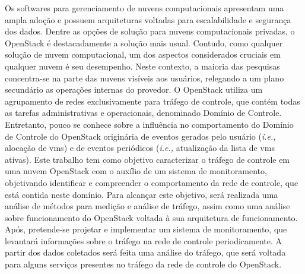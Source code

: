 Os softwares para gerenciamento de nuvens computacionais apresentam uma ampla adoção e possuem arquiteturas voltadas para escalabilidade e segurança dos dados. 
%
Dentre as opções de solução para nuvens computacionais privadas, o OpenStack é destacadamente a solução mais usual.
%
Contudo, como qualquer solução de nuvem computacional, um dos aspectos considerados cruciais em qualquer nuvem é seu desempenho.
%
Neste contexto, a maioria das pesquisas concentra-se na parte das nuvens visíveis aos usuários, relegando a um plano secundário as operações internas do provedor.
%
O OpenStack utiliza um agrupamento de redes exclusivamente para tráfego de controle, que contém todas as tarefas administrativas e operacionais, denominado Domínio de Controle. 
%
Entretanto, pouco se conhece sobre a influência no comportamento do Domínio de Controle do OpenStack originária de eventos gerados pelo usuário (\textit{i.e.,} alocação de \acp{vm}) e de eventos periódicos (\textit{i.e.,} atualização da lista de \acp{vm} ativas). 
%
Este trabalho tem como objetivo caracterizar o tráfego de controle em uma nuvem OpenStack com o auxílio de um sistema de monitoramento, objetivando identificar e compreender o comportamento da rede de controle, que está contida neste domínio.
%
Para alcançar este objetivo, será realizada uma análise de métodos para medição e análise de tráfego, assim como uma análise sobre funcionamento do OpenStack voltada à sua arquitetura de funcionamento. 
%
Após, pretende-se projetar e implementar um sistema de monitoramento, que levantará informações sobre o tráfego na rede de controle periodicamente. 
%
A partir dos dados coletados será feita uma análise do tráfego, que será voltada para alguns serviços presentes no tráfego da rede de controle do OpenStack.